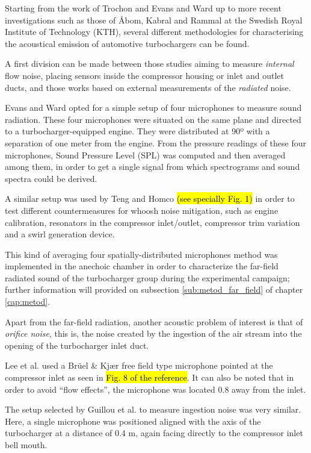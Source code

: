 Starting from the work of Trochon \cite{trochon2001new} and Evans and Ward \cite{evans2005minimizing,evans2006reduction} up to more recent investigations such as those of Åbom, Kabral and Rammal \cite{kabral2013acoustical,kabral2014investigation} at the Swedish Royal Institute of Technology (KTH), several different methodologies for characterising the acoustical emission of automotive turbochargers can be found.

A first division can be made between those studies aiming to measure \emph{internal} flow noise, placing sensors inside the compressor housing or inlet and outlet ducts, and those works based on external measurements of the \emph{radiated} noise.

Evans and Ward \cite{evans2005minimizing,evans2006reduction} opted for a simple setup of four microphones to measure sound radiation. These four microphones were situated on the same plane and directed to a turbocharger-equipped engine. They were distributed at 90º with a separation of one meter from the engine. From the pressure readings of these four microphones, Sound Pressure Level (SPL) was computed and then averaged among them, in order to get a single signal from which spectrograms and sound spectra could be derived.

A similar setup was used by Teng and Homco \cite{teng2009investigation} \hl{(see specially Fig. 1)} in order to test different countermeasures for whoosh noise mitigation, such as engine calibration, resonators in the compressor inlet/outlet, compressor trim variation and a swirl generation device. 

This kind of averaging four spatially-distributed microphones method was implemented in the anechoic chamber in order to characterize the far-field radiated sound of the turbocharger group during the experimental campaign; further information will provided on subsection \ref{sub:metod_far_field} of chapter \ref{cap:metod}.

Apart from the far-field radiation, another acoustic problem of interest is that of \emph{orifice noise}, this is, the noise created by the ingestion of the air stream into the opening of the turbocharger inlet duct. 

Lee et al. \cite{lee2011control} used a Brüel \& Kj\ae r free field type microphone pointed at the compressor inlet as seen in \hl{Fig. 8 of the reference}. It can also be noted that in order to avoid ``flow effects'', the microphone was located 0.8 away from the inlet.

The setup selected by Guillou et al. \cite{guillou2010characterization} to measure ingestion noise was very similar. Here, a single microphone was positioned aligned with the axis of the turbocharger at a distance of 0.4 m, again facing directly to the compressor inlet bell mouth.

